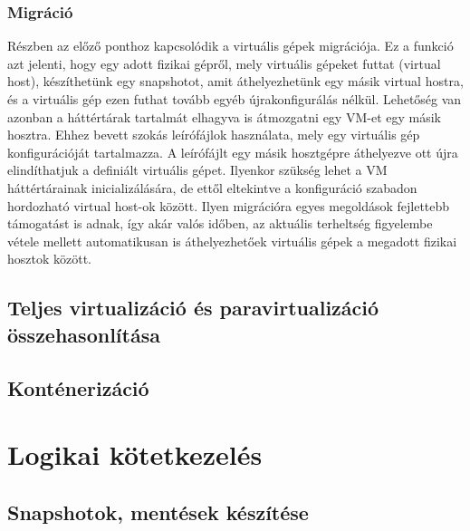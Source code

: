\subsubsection{Migráció}
Részben az előző ponthoz kapcsolódik a virtuális gépek migrációja. Ez a funkció azt jelenti, hogy egy adott fizikai gépről, mely virtuális gépeket futtat (virtual host), készíthetünk egy snapshotot, amit áthelyezhetünk egy másik virtual hostra, és a virtuális gép ezen futhat tovább egyéb újrakonfigurálás nélkül.
Lehetőség van azonban a háttértárak tartalmát elhagyva is átmozgatni egy VM-et egy másik hosztra. Ehhez bevett szokás leírófájlok használata, mely egy virtuális gép konfigurációját tartalmazza. A leírófájlt egy másik hosztgépre áthelyezve ott újra elindíthatjuk a definiált virtuális gépet. Ilyenkor szükség lehet a VM háttértárainak inicializálására, de ettől eltekintve a konfiguráció szabadon hordozható virtual host-ok között. Ilyen migrációra egyes megoldások fejlettebb támogatást is adnak, így akár valós időben, az aktuális terheltség figyelembe vétele mellett automatikusan is áthelyezhetőek virtuális gépek a megadott fizikai hosztok között.

\subsection{Teljes virtualizáció és paravirtualizáció összehasonlítása}
\subsection{Konténerizáció}

\section{Logikai kötetkezelés}
\subsection{Snapshotok, mentések készítése}


